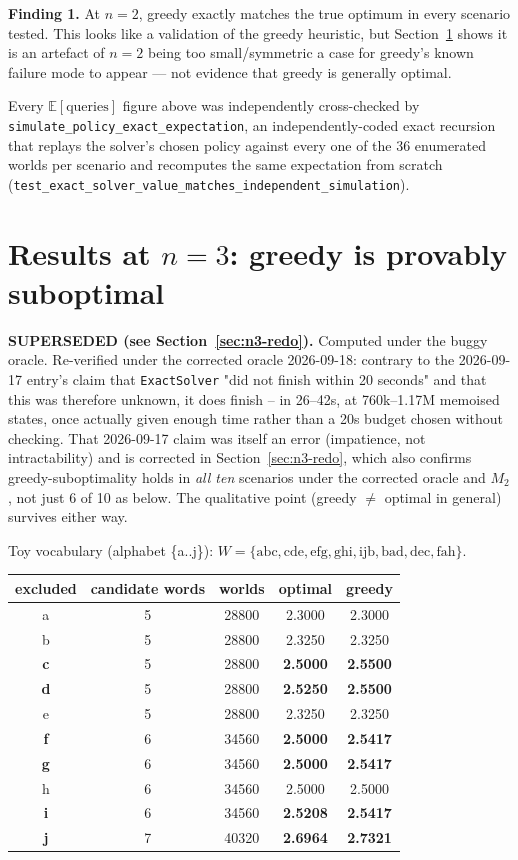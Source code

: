 \documentclass[11pt]{article}
\begin{document}
\textbf{Finding 1.} At $n=2$, greedy exactly matches the true optimum in
every scenario tested. This looks like a validation of the greedy
heuristic, but Section~\ref{sec:n3} shows it is an artefact of $n=2$ being
too small/symmetric a case for greedy's known failure mode to appear ---
not evidence that greedy is generally optimal.

Every $\mathbb{E}[\text{queries}]$ figure above was independently
cross-checked by \texttt{simulate\_policy\_exact\_expectation}, an
independently-coded exact recursion that replays the solver's chosen
policy against every one of the 36 enumerated worlds per scenario and
recomputes the same expectation from scratch
(\texttt{test\_exact\_solver\_value\_matches\_independent\_simulation}).

\section{Results at $n=3$: greedy is provably suboptimal}
\label{sec:n3}

\textbf{SUPERSEDED (see Section~\ref{sec:n3-redo}).} Computed under the
buggy oracle. Re-verified under the corrected oracle 2026-09-18: contrary
to the 2026-09-17 entry's claim that \texttt{ExactSolver} "did not finish
within 20 seconds" and that this was therefore unknown, it does finish --
in 26--42s, at 760k--1.17M memoised states, once actually given enough
time rather than a 20s budget chosen without checking. That 2026-09-17
claim was itself an error (impatience, not intractability) and is
corrected in Section~\ref{sec:n3-redo}, which also confirms
greedy-suboptimality holds in \emph{all ten} scenarios under the corrected
oracle and $M_2$, not just 6 of 10 as below. The qualitative point (greedy
$\ne$ optimal in general) survives either way.

Toy vocabulary (alphabet \{a..j\}): $W = \{\mathrm{abc, cde, efg, ghi, ijb,
bad, dec, fah}\}$.

\begin{center}
\begin{tabular}{ccccc}
\toprule
excluded & candidate words & worlds & optimal & greedy \\
\midrule
a & 5 & 28800 & 2.3000 & 2.3000 \\
b & 5 & 28800 & 2.3250 & 2.3250 \\
\textbf{c} & 5 & 28800 & \textbf{2.5000} & \textbf{2.5500} \\
\textbf{d} & 5 & 28800 & \textbf{2.5250} & \textbf{2.5500} \\
e & 5 & 28800 & 2.3250 & 2.3250 \\
\textbf{f} & 6 & 34560 & \textbf{2.5000} & \textbf{2.5417} \\
\textbf{g} & 6 & 34560 & \textbf{2.5000} & \textbf{2.5417} \\
h & 6 & 34560 & 2.5000 & 2.5000 \\
\textbf{i} & 6 & 34560 & \textbf{2.5208} & \textbf{2.5417} \\
\textbf{j} & 7 & 40320 & \textbf{2.6964} & \textbf{2.7321} \\
\bottomrule
\end{tabular}
\end{center}
\end{document}
